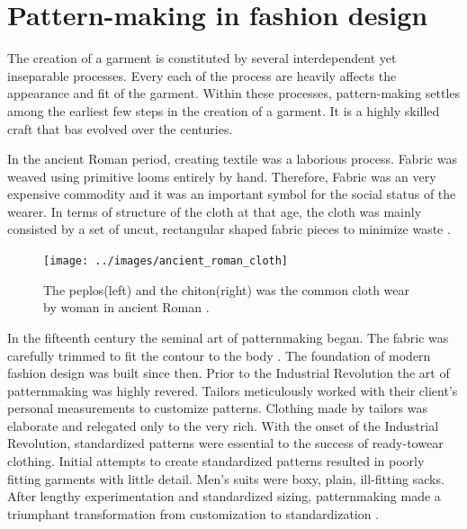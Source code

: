 \section{Pattern-making in fashion design}

The creation of a garment is constituted by several interdependent yet inseparable processes. Every each of the process are heavily affects the appearance and fit of the garment. Within these processes, pattern-making settles among the earliest few steps in the creation of a garment. It is a highly skilled craft that bas evolved over the centuries. 

In the ancient Roman period, creating textile was a laborious process. Fabric was weaved using primitive looms entirely by hand. Therefore, Fabric was an very expensive commodity and it was an important symbol for the social status of the wearer. In terms of structure of the cloth at that age, the cloth was mainly consisted by a set of uncut, rectangular shaped fabric pieces to minimize waste \cite{Caroline1996}. 

\begin{figure}[ht]
    \centering
	\texttt{[image: ../images/ancient\_roman\_cloth]}\\[1cm]
    \caption{The peplos(left) and the chiton(right) was the common cloth wear by woman in ancient Roman \cite{McManus2003}.}
    \label{figure:fig3}
\end{figure}

In the fifteenth century the seminal art of patternmaking began. The fabric was carefully trimmed to fit the contour to the body \cite{macdonald2009principles}. The foundation of modern fashion design was built since then. Prior to the Industrial Revolution the art of patternmaking was highly revered. Tailors meticulously worked with their client's personal measurements to customize patterns. Clothing made by tailors was elaborate and relegated only to the very rich. With the onset of the Industrial Revolution, standardized patterns were essential to the success of ready-towear clothing. Initial attempts to create standardized patterns resulted in poorly fitting garments with little detail. Men's suits were boxy, plain, ill-fitting sacks. After lengthy experimentation and standardized sizing, patternmaking made a triumphant transformation from customization to standardization \cite{macdonald2009principles}.

